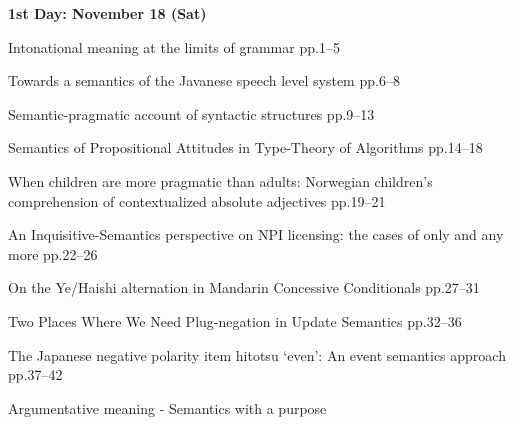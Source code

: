 \documentclass[12pt]{jarticle}
\begin{document}
\noindent\textbf{\large 
1st Day: November 18 (Sat)
}\\










  
     {Intonational meaning at the limits of grammar}
     {pp.1--5}
  
     {Towards a semantics of the Javanese speech level system}
     {pp.6--8}
  
     {Semantic-pragmatic account of syntactic structures}
     {pp.9--13}



 
  
     {Semantics of Propositional Attitudes in Type-Theory of Algorithms}
     {pp.14--18}
  
     {When children are more pragmatic than adults: Norwegian children's comprehension of contextualized absolute adjectives}
     {pp.19--21}
  
     {An Inquisitive-Semantics perspective on NPI licensing: the cases of only and any more}
     {pp.22--26}






 
  
     {On the Ye/Haishi alternation in Mandarin Concessive Conditionals}
     {pp.27--31}
  
     {Two Places Where We Need Plug-negation in Update Semantics}
     {pp.32--36}
  
     {The Japanese negative polarity item hitotsu `even': An event semantics approach}
     {pp.37--42}







  
      {Argumentative meaning - Semantics with a purpose}
      {}
\end{document}
